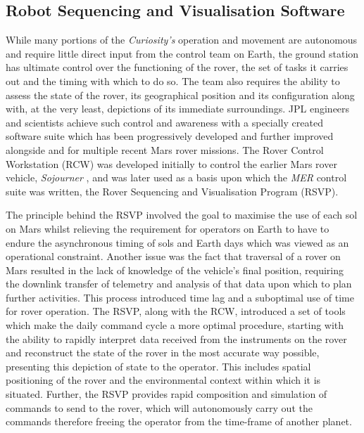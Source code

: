    \subsection{Robot Sequencing and Visualisation Software}
      While many portions of the \textit{Curiosity's} operation and movement are autonomous and require little direct input from the control team on Earth, the ground station has ultimate control over the functioning of the rover, the set of tasks it carries out and the timing with which to do so. The team also requires the ability to assess the state of the rover, its geographical position and its configuration along with, at the very least, depictions of its immediate surroundings. JPL engineers and scientists achieve such control and awareness with a specially created software suite which has been progressively developed and further improved alongside and for multiple recent Mars rover missions. The Rover Control Workstation (RCW) was developed initially to control the earlier Mars rover vehicle, \textit{Sojourner} \cite{cooper1998driving}, and was later used as a basis upon which the \textit{MER} control suite was written, the Rover Sequencing and Visualisation Program (RSVP).
      
      The principle behind the RSVP involved the goal to maximise the use of each sol on Mars whilst relieving the requirement for operators on Earth to have to endure the asynchronous timing of sols and Earth days which was viewed as an operational constraint. Another issue was the fact that traversal of a rover on Mars resulted in the lack of knowledge of the vehicle's final position, requiring the downlink transfer of telemetry and analysis of that data upon which to plan further activities. This process introduced time lag and a suboptimal use of time for rover operation. The RSVP, along with the RCW, introduced a set of tools which make the daily command cycle a more optimal procedure, starting with the ability to rapidly interpret data received from the instruments on the rover and reconstruct the state of the rover in the most accurate way possible, presenting this depiction of state to the operator. This includes spatial positioning of the rover and the environmental context within which it is situated. Further, the RSVP provides rapid composition and simulation of commands to send to the rover, which will autonomously carry out the commands therefore freeing the operator from the time-frame of another planet.
      

